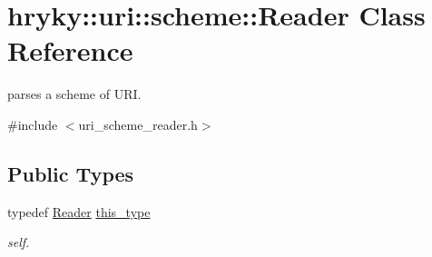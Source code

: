 \hypertarget{classhryky_1_1uri_1_1scheme_1_1_reader}{\section{hryky\-:\-:uri\-:\-:scheme\-:\-:Reader Class Reference}
\label{classhryky_1_1uri_1_1scheme_1_1_reader}
}


parses a scheme of U\-R\-I.  




{\ttfamily \#include $<$uri\-\_\-scheme\-\_\-reader.\-h$>$}

\subsection*{Public Types}
\begin{DoxyCompactItemize}
\item 
\hypertarget{classhryky_1_1uri_1_1scheme_1_1_reader_a06f7352c04d11e56624f3fe26280411f}{typedef \hyperlink{classhryky_1_1uri_1_1scheme_1_1_reader}{Reader} \hyperlink{classhryky_1_1uri_1_1scheme_1_1_reader_a06f7352c04d11e56624f3fe26280411f}{this\-\_\-type}}\label{classhryky_1_1uri_1_1scheme_1_1_reader_a06f7352c04d11e56624f3fe26280411f}

\begin{DoxyCompactList}\small\item\em self. \end{DoxyCompactList}\end{DoxyCompactItemize}
